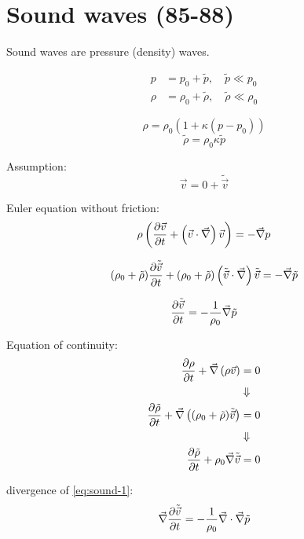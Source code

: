 \section{Sound waves (85-88)}
Sound waves are pressure (density) waves.

\begin{align}
p&=p_0+\tilde{p}, \quad\tilde{p}\ll p_0\\
\rho&=\rho_0+\tilde{\rho}, \quad\tilde{\rho}\ll\rho_0
\end{align}

\begin{equation}
\rho=\rho_0(1+\kappa(p-p_0))
\end{equation}
\begin{equation}
\tilde{\rho} = \rho_0\kappa\tilde{p}
\end{equation}

Assumption:
\begin{equation}
\vec{v}=0+\tilde{\vec{v}}
\end{equation}

Euler equation without friction:
\begin{equation}
\rho\left(\frac{\partial \vec{v}}{\partial t}+\left(\vec{v}\cdot\vec{\nabla}\right)\vec{v}\right)=-\vec{\nabla}p
\end{equation}

\begin{equation}
(\rho_0 + \tilde{\rho})\frac{\partial \tilde{\vec{v}}}{\partial t}+(\rho_0+\tilde{\rho})\left(\tilde{\vec{v}}\cdot\vec{\nabla}\right)\tilde{\vec{v}} = -\vec{\nabla}\tilde{p}
\end{equation}

\begin{equation}\label{eq:sound-1}
\frac{\partial \tilde{\vec{v}}}{\partial t}=-\frac{1}{\rho_0}\vec{\nabla}\tilde{p}
\end{equation}

Equation of continuity:
\begin{align}
\frac{\partial \rho}{\partial t}+\vec{\nabla}\left(\rho\vec{v}\right)&=0\\
&\Downarrow\notag\\
\frac{\partial \tilde{\rho}}{\partial t}+\vec{\nabla}\left((\rho_0+\tilde{\rho})\tilde{\vec{v}}\right) &= 0\\
&\Downarrow\notag\\
\frac{\partial \tilde{\rho}}{\partial t}+\rho_0\vec{\nabla}\tilde{\vec{v}}&=0\label{eq:sound-2}
\end{align}

divergence of \eqref{eq:sound-1}:
\begin{equation}
\vec{\nabla}\frac{\partial \tilde{\vec{v}}}{\partial t}=-\frac{1}{\rho_0}\vec{\nabla}\cdot\vec{\nabla}\tilde{p}
\end{equation}

